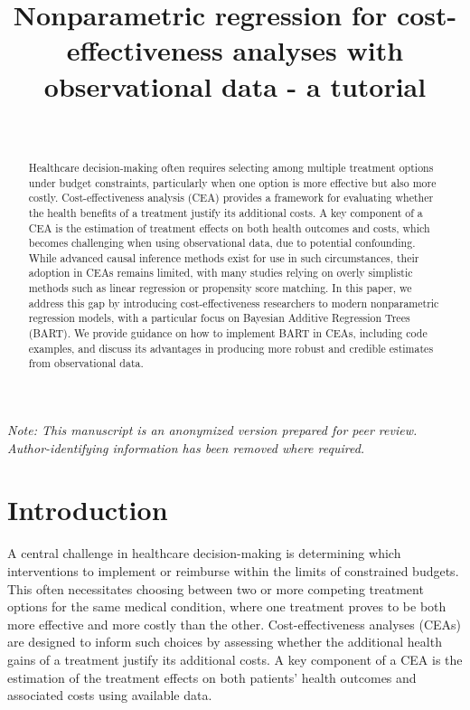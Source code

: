 \documentclass[aoas,preprint]{imsart}
\theoremstyle{plain}
\theoremstyle{definition}
\theoremstyle{remark}
\theoremstyle{remark}
\begin{document}
\noindent\textit{Note: This manuscript is an anonymized version prepared for peer review. Author-identifying information has been removed where required.}

\begin{frontmatter}
\title{Nonparametric regression for cost-effectiveness analyses with observational data - a tutorial}

\begin{aug}
\author{~}
\address{Anonymous affiliation(s) withheld for peer review.}
\end{aug}

\begin{abstract}
Healthcare decision-making often requires selecting among multiple treatment options under budget constraints, particularly when one option is more effective but also more costly. Cost-effectiveness analysis (CEA) provides a framework for evaluating whether the health benefits of a treatment justify its additional costs. A key component of a CEA is the estimation of treatment effects on both health outcomes and costs, which becomes challenging when using observational data, due to potential confounding. While advanced causal inference methods exist for use in such circumstances, their adoption in CEAs remains limited, with many studies relying on overly simplistic methods such as linear regression or propensity score matching. 
In this paper, we address this gap by introducing cost-effectiveness researchers to modern nonparametric regression models, with a particular focus on Bayesian Additive Regression Trees (BART). We provide guidance on how to implement BART in CEAs, including code examples, and discuss its advantages in producing more robust and credible estimates from observational data. 
\end{abstract}

\end{frontmatter}

\section{Introduction}

A central challenge in healthcare decision-making is determining which interventions to implement or reimburse within the limits of constrained budgets. This often necessitates choosing between two or more competing treatment options for the same medical condition, where one treatment proves to be both more effective and more costly than the other. Cost-effectiveness analyses (CEAs) are designed to inform such choices by assessing whether the additional health gains of a treatment justify its additional costs.  A key component of a CEA is the estimation of the treatment effects on both patients’ health outcomes and associated costs using available data.
\end{document}
